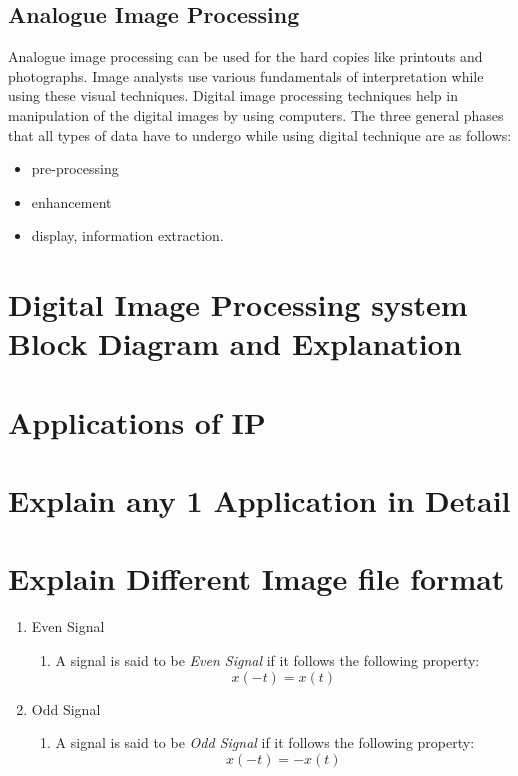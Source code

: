 \documentclass{article}
\begin{document}
\begin{multicols}{2}
            \subsection{Analogue Image Processing}
                Analogue image processing can be used for the hard copies like printouts and photographs. Image analysts use various fundamentals of interpretation while using these visual techniques. Digital image processing techniques help in manipulation of the digital images by using computers. The three general phases that all types of data have to undergo while using digital technique are as follows:
                \begin{itemize}
                    \item pre-processing
                    \item enhancement
                    \item display, information extraction.
                \end{itemize}

        \section{Digital Image Processing system Block Diagram and Explanation}
        \section{Applications of IP}
        \section{Explain any 1 Application in Detail}
        \section{Explain Different Image file format}










        \begin{enumerate}
                \item Even Signal
                \begin{enumerate}
                    \item[] A signal is said to be \textit{Even Signal} if it follows the following property: \newline $$x(-t) = x(t)$$
                \end{enumerate}
                \item Odd Signal
                \begin{enumerate}
                    \item[] A signal is said to be \textit{Odd Signal} if it follows the following property: \newline $$x(-t) = -x(t)$$
                \end{enumerate}
            \end{enumerate}
        
    \end{multicols}
\end{document}
